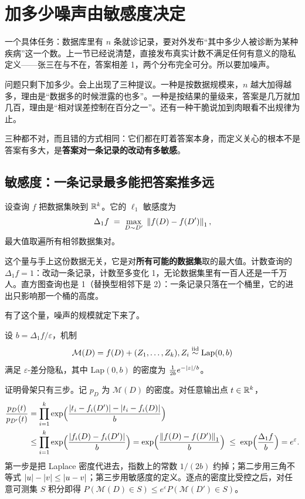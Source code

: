 \section{加多少噪声由敏感度决定}
\label{sec:17-Constrained-Guarantees/01-Differential-Privacy/02}

一个具体任务：数据库里有 \(n\) 条就诊记录，要对外发布``其中多少人被诊断为某种疾病''这一个数。上一节已经说清楚，直接发布真实计数不满足任何有意义的隐私定义——张三在与不在，答案相差 1，两个分布完全可分。所以要加噪声。

问题只剩下加多少。会上出现了三种提议。一种是按数据规模来，\(n\) 越大加得越多，理由是``数据多的时候泄露的也多''。一种是按结果的量级来，答案是几万就加几百，理由是``相对误差控制在百分之一''。还有一种干脆说加到肉眼看不出规律为止。

三种都不对，而且错的方式相同：它们都在盯着答案本身，而定义关心的根本不是答案有多大，是\textbf{答案对一条记录的改动有多敏感}。

\subsection{敏感度：一条记录最多能把答案推多远}

\begin{definition}
设查询 \(f\) 把数据集映到 \(\mathbb{R}^k\)。它的 \(\ell_1\) 敏感度为
\[
\Delta_1 f\;=\;\max_{D\sim D'}\;\left\lVert f(D)-f(D')\right\rVert_1 ,
\]
最大值取遍所有相邻数据集对。
\end{definition}

这个量与手上这份数据无关，它是对\textbf{所有可能的数据集}取的最大值。计数查询的 \(\Delta_1 f=1\)：改动一条记录，计数至多变化 1，无论数据集里有一百人还是一千万人。直方图查询也是 1（替换型相邻下是 2）：一条记录只落在一个桶里，它的进出只影响那一个桶的高度。

有了这个量，噪声的规模就定下来了。

\begin{theorem}[Laplace 机制]
设 \(b=\Delta_1 f/\varepsilon\)，机制
\[
\mathcal M(D)=f(D)+(Z_1,\dots,Z_k),\space Z_i\stackrel{\mathrm{iid}}{\sim}\mathrm{Lap}(0,b)
\]
满足 \(\varepsilon\)-差分隐私，其中 \(\mathrm{Lap}(0,b)\) 的密度为 \(\frac{1}{2b}e^{-\left|z\right|/b}\)。
\end{theorem}

证明骨架只有三步。记 \(p_D\) 为 \(\mathcal M(D)\) 的密度。对任意输出点 \(t\in\mathbb{R}^k\)，
\[
\begin{aligned}
\frac{p_D(t)}{p_{D'}(t)}
&=\prod_{i=1}^{k}\exp\!\Big(\frac{\left|t_i-f_i(D')\right|-\left|t_i-f_i(D)\right|}{b}\Big)\\
&\le\prod_{i=1}^{k}\exp\!\Big(\frac{\left|f_i(D)-f_i(D')\right|}{b}\Big)
=\exp\!\Big(\frac{\left\lVert f(D)-f(D')\right\rVert_1}{b}\Big)
\;\le\;\exp\!\Big(\frac{\Delta_1 f}{b}\Big)=e^{\varepsilon}.
\end{aligned}
\]
第一步是把 Laplace 密度代进去，指数上的常数 \(1/(2b)\) 约掉；第二步用三角不等式 \(\left|u\right|-\left|v\right|\le\left|u-v\right|\)；第三步用敏感度的定义。逐点的密度比受控之后，对任意可测集 \(S\) 积分即得 \(P(\mathcal M(D)\in S)\le e^{\varepsilon}P(\mathcal M(D')\in S)\)。

